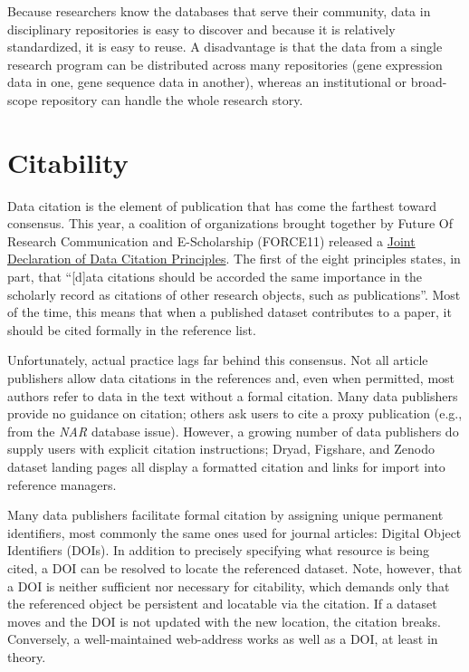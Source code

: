 \documentclass[10pt,a4paper,twocolumn]{article}
\begin{document}
{Because researchers know the databases that serve their community, data in disciplinary repositories is easy to discover and because it is relatively standardized, it is easy to reuse. 
A disadvantage is that the data from a single research program can be distributed across many repositories (gene expression data in one, gene sequence data in another), whereas an institutional or broad-scope repository can handle the whole research story.


\section*{Citability}\label{citability}

Data citation is the element of publication that has come the farthest toward consensus.
This year, a coalition of organizations brought together by Future Of Research Communication and E-Scholarship (FORCE11)\cite{bourne_improving_2012} released a \href{http://www.force11.org/datacitation}{Joint Declaration of Data Citation Principles}.
The first of the eight principles states, in part, that ``[d]ata citations should be accorded the same importance in the scholarly record as citations of other research objects, such as publications''.
Most of the time, this means that when a published dataset contributes to a paper, it should be cited formally in the reference list.
	
Unfortunately, actual practice lags far behind this consensus.
Not all article publishers allow data citations in the references and, even when permitted, most authors refer to data in the text without a formal citation\cite{mooney_anatomy_2011}.
Many data publishers provide no guidance on citation; others ask users to cite a proxy publication (e.g., from the \emph{NAR} database issue).
However, a growing number of data publishers do supply users with explicit citation instructions; Dryad, Figshare, and Zenodo dataset landing pages all display a formatted citation and links for import into reference managers.

Many data publishers facilitate formal citation by assigning unique permanent identifiers, most commonly the same ones used for journal articles: Digital Object Identifiers (DOIs).
In addition to precisely specifying what resource is being cited, a DOI can be resolved to locate the referenced dataset.
Note, however, that a DOI is neither sufficient nor necessary for citability, which demands only that the referenced object be persistent and locatable via the citation.
If a dataset moves and the DOI is not updated with the new location, the citation breaks.
Conversely, a well-maintained web-address works as well as a DOI, at least in theory.

}
\end{document}
